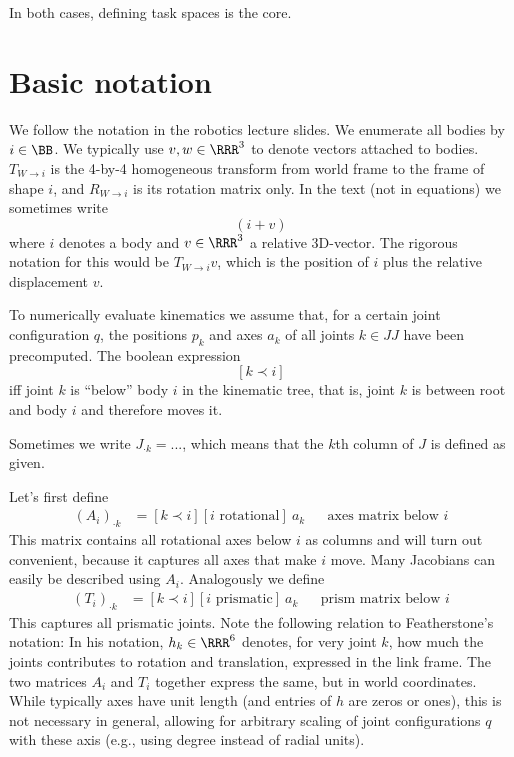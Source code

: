 \documentclass[10pt,fleqn,twoside]{article}
\newcommand{\TR}[2]{T_{{#1}\rightarrow{#2}}}
\newcommand{\RO}[2]{R_{{#1}\rightarrow{#2}}}
\begin{document}
In both cases, defining task spaces is the core.

\section{Basic notation}

We follow the notation in the robotics lecture slides. We enumerate
all bodies by $i\in\BB$. We typically use $v,w\in\RRR^3$ to denote
vectors attached to bodies. $\TR{W}{i}$ is the 4-by-4 homogeneous
transform from world frame to the frame of shape $i$, and $\RO{W}{i}$
is its rotation matrix only. In the text (not in equations) we
sometimes write
$$(i+ v)$$
where $i$ denotes a body and $v\in\RRR^3$ a relative 3D-vector. The
rigorous notation for this would be $\TR{W}{i} v$, which is the
position of $i$ plus the relative displacement $v$.

To numerically evaluate kinematics we assume that, for a certain joint
configuration $q$, the positions $p_k$ and axes $a_k$ of all joints
$k\in JJ$ have been precomputed. The boolean expression
$$[k\prec i] $$ iff joint $k$ is ``below'' body $i$ in the kinematic
tree, that is, joint $k$ is between root and body $i$ and therefore
moves it.

Sometimes we write $J_{\cdot k}=...$, which means that the $k$th
column of $J$ is defined as given.

Let's first define
\begin{align}
(A_i)_{\cdot k}
&= [k \prec i] [\text{$i$ rotational}]~ a_k && \text{axes matrix below $i$}
\end{align}
This matrix contains all rotational axes below $i$ as columns and will
turn out convenient, because it captures all axes that make $i$
move. Many Jacobians can easily be described using $A_i$. Analogously
we define
\begin{align}
(T_i)_{\cdot k}
&= [k \prec i] [\text{$i$ prismatic}]~ a_k && \text{prism matrix below $i$}
\end{align}
This captures all prismatic joints. Note the following relation to
Featherstone's notation: In his notation, $h_k\in\RRR^6$ denotes, for
very joint $k$, how much the joints contributes to rotation and translation,
expressed in the link frame. The two matrices $A_i$ and $T_i$ together
express the same, but in world coordinates. While typically axes have
unit length (and entries of $h$ are zeros or ones), this is not necessary
in general, allowing for arbitrary scaling of joint configurations $q$
with these axis (e.g., using degree instead of radial units).
\end{document}
